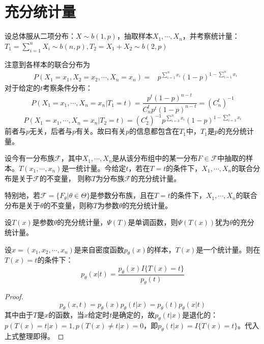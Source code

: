 \documentclass[UTF-8]{ctexbeamer}
\begin{document}

 \section{充分统计量}
 \begin{frame}
   \begin{Eg}
     设总体服从二项分布：$X\sim b(1,p)$，抽取样本$X_{1},\cdots,X_{n}$，并考察统计量：$T_{1}=\sum_{i=1}^{n}X_{i}\sim b(n,p),T_{2}=X_{1}+X_{2}\sim b(2,p)$

     注意到各样本的联合分布为
     \begin{align*}
       &P(X_{1}=x_{1},X_{2}=x_{2},\cdots, X_{n}=x_{n})
       =&p^{\sum_{i=1}^{n}x_{i}}(1-p)^{1-\sum_{i=1}^{n}x_{i}}
     \end{align*}
     对于给定的$t$考察条件分布：
     \[P(X_{1}=x_{1},\cdots,X_{n}=x_{n}|T_{1}=t)=\frac{p^{t}(1-p)^{n-t}}{C_{n}^{t}p^{t}(1-p)^{n-t}}=(C_{n}^{t})^{-1}\]
     \[P(X_{1}=x_{1},\cdots,X_{n}=x_{n}|T_{2}=t)=(C_{2}^{t})^{-1}p^{\sum_{i=3}^{n}x_{i}}(1-p)^{1-\sum_{i=3}^{n}x_{i}}\]
     前者与$p$无关，后者与$p$有关。故曰有关$p$的信息都包含在$T_{1}$中，$T_{1}$是$p$的充分统计量。
   \end{Eg}
 \end{frame}

 \begin{frame}
   \begin{Def}
     设今有一分布族$\mathscr{F}$，其中$X_{1},\cdots,X_{n}$是从该分布组中的某一分布$F\in \mathscr{F}$中抽取的样本。$T(x_{1},\cdots,x_{n})$是一统计量。今给定$t$，若在$T=t$的条件下，$X_{1},\cdots,X_{n}$的联合分布是关于$\mathscr{F}$的不变量，
     则称$T$为分布族$\mathscr{F}$的充分统计量。

     特别地，若$\mathscr{F}=\{F_{\theta}|\theta\in \Theta\}$是参数分布族，且在$T=t$的条件下，$X_{1},\cdots,X_{n}$的联合分布是关于$\theta$的不变量，则称$T$为参数$\theta$的充分统计量。
   \end{Def}

 
 \begin{Thm}
   设$T(x)$是参数$\theta$的充分统计量，$\Psi(T)$是单调函数，则$\Psi(T(x))$犹为$\theta$的充分统计量。
 \end{Thm}

\end{frame}

\begin{frame}
  \begin{Lemma}
    设$x=(x_{1},x_{2},\cdots,x_{n})$是来自密度函数$p_{\theta}(x)$的样本，$T(x)$是一个统计量。则在$T(x)=t$的条件下：
    \[p_{\theta}(x|t)=\frac{p_{\theta}(x)I\{T(x)=t\}}{p_{\theta}(t)}\]
  \end{Lemma}
  \begin{proof}
    \[p_{\theta}(x,t)=p_{\theta}(x)p_{\theta}(t|x)=p_{\theta}(t)p_{\theta}(x|t)\]
    其中由于$T$是$x$的函数，当$x$给定时$t$是确定的，故$p_{\theta}(t|x)$是退化的：$p(T(x)=t|x)=1,p(T(x)\neq t|x)=0$，即$p_{\theta}(t|x)=I\{T(x)=t\}$。代入上式整理即得。
  \end{proof}
\end{frame}
\end{document}
